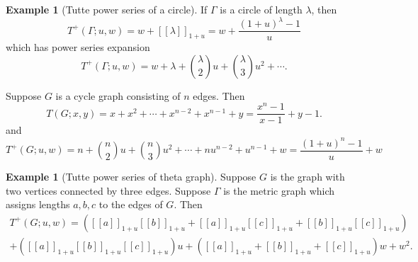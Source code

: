 \documentclass{amsart}
\theoremstyle{definition}
\newtheorem{eg}[thm]{Example}
\newcommand{\fanalog}[2]{[\![#2]\!]_{#1}}
\begin{document}
\begin{eg}[Tutte power series of a circle]
If $\Gamma$ is a circle of length $\lambda$, then 
\[
	T^+(\Gamma;u,w) = w + \fanalog{1 + u}{\lambda} = w + \frac{(1 + u)^\lambda - 1}{u}
\]
which has power series expansion
\[
	T^+(\Gamma;u,w) = w + \lambda + \binom{\lambda}{2} u + \binom{\lambda}{3} u^2 + \cdots .
\]

Suppose $G$ is a cycle graph consisting of $n$ edges.
Then
$$
T(G;x,y) = x + x^2 + \cdots + x^{n-2} + x^{n-1} + y 
= \frac{x^n - 1}{x - 1} + y - 1.
$$
and
$$
T^+(G;u,w) = n + \binom{n}{2}u + \binom{n}{3} u^2 + \cdots + nu^{n-2} + u^{n-1} + w
= \frac{(1+u)^n-1}{u} + w
$$
\end{eg}

\begin{eg}[Tutte power series of theta graph]
Suppose $G$ is the graph with two vertices connected by three edges.
Suppose $\Gamma$ is the metric graph which assigns lengths $a,b,c$ to the edges of $G$.
Then
\begin{multline*}
T^+(G;u,w) = ( \fanalog{1 + u}{a} \fanalog{1 + u}{b} + \fanalog{1 + u}{a} \fanalog{1 + u}{c} + \fanalog{1 + u}{b} \fanalog{1 + u}{c} ) \\
+ ( \fanalog{1 + u}{a} \fanalog{1 + u}{b} \fanalog{1 + u}{c} ) u 
+ (\fanalog{1 + u}{a} + \fanalog{1 + u}{b} + \fanalog{1 + u}{c}) w + w^2 .
\end{multline*}

\end{eg}
\end{document}
